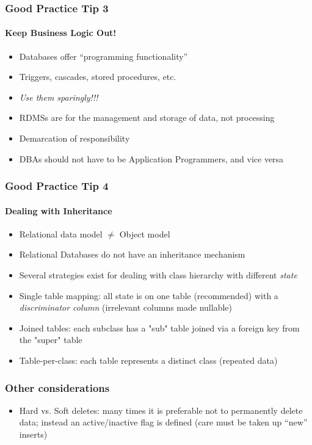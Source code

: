 \documentclass{beamer}
\begin{document}
\begin{frame}[fragile]
  \frametitle{Good Practice Tip 3}
  \framesubtitle{Keep Business Logic Out!}

\begin{itemize}
  \item Databases offer ``programming functionality''
  \item Triggers, cascades, stored procedures, etc.
  \item \emph{Use them sparingly!!!}
  \item RDMSs are for the management and storage of data, not processing
  \item Demarcation of responsibility
  \item DBAs should not have to be Application Programmers, and vice versa
\end{itemize}

\end{frame}

\begin{frame}[fragile]
  \frametitle{Good Practice Tip 4}
  \framesubtitle{Dealing with Inheritance}

  \begin{itemize}
    \item Relational data model $\neq$ Object model
    \item Relational Databases do not have an inheritance mechanism
    \item Several strategies exist for dealing with class hierarchy with different \emph{state}
    \item Single table mapping: all state is on one table (recommended) with a \emph{discriminator column} (irrelevant columns made nullable)
    \item Joined tables: each subclass has a "sub" table joined via a foreign key from the "super" table
    \item Table-per-class: each table represents a distinct class (repeated data)
  \end{itemize}

\end{frame}

\begin{frame}[fragile]
  \frametitle{Other considerations}

  \begin{itemize}
    \item Hard vs. Soft deletes: many times it is preferable not to permanently delete data; instead an active/inactive flag is defined (care must be taken up ``new'' inserts)
  \end{itemize}

\end{frame}
\end{document}
